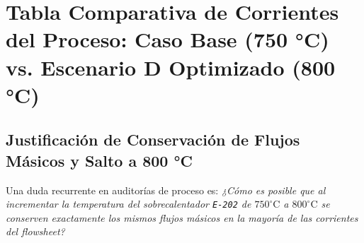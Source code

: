 \documentclass[11pt,letterpaper]{article}
\begin{document}
\section{Tabla Comparativa de Corrientes del Proceso: Caso Base (750 °C) vs. Escenario D Optimizado (800 °C)}

\subsection{Justificación de Conservación de Flujos Másicos y Salto a 800 °C}
Una duda recurrente en auditorías de proceso es: \textit{¿Cómo es posible que al incrementar la temperatura del sobrecalentador \texttt{E-202} de $750^\circ\text{C}$ a $800^\circ\text{C}$ se conserven exactamente los mismos flujos másicos en la mayoría de las corrientes del flowsheet?}
\end{document}
